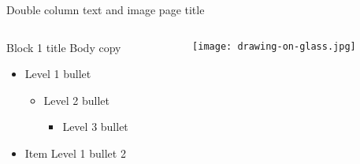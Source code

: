 \documentclass[t]{beamer}
\begin{document}
\begin{frame}{Double column text and image page title}
	\begin{columns}[T,totalwidth=\textwidth]
  		\begin{column}{0.45\textwidth}
  			\begin{block}{Block 1 title}
    				Body copy
    				\begin{itemize}    
    					\item Level 1 bullet
  					\begin{itemize}
  						\item Level 2 bullet
  						\begin{itemize}
  							\item Level 3 bullet
  						\end{itemize}
  					\end{itemize}
    					\item Item Level 1 bullet 2
    				\end{itemize}  
			\end{block}
  		\end{column} %
  		\begin{column}{0.45\textwidth}
			\vspace{-1.5\frametitlesize}
			\begin{figure}
				\texttt{[image: drawing-on-glass.jpg]}
			\end{figure}
  		\end{column}%
	\end{columns}
\end{frame}
\end{document}

